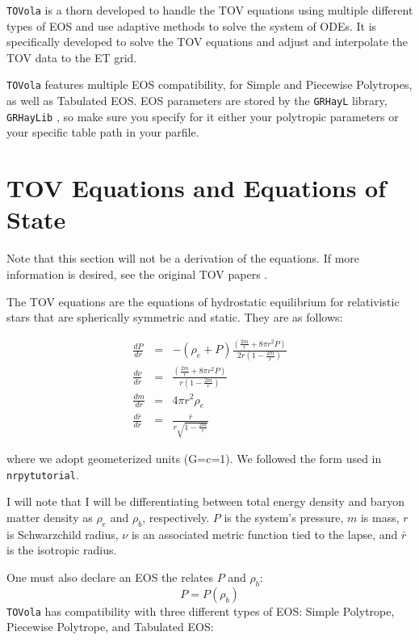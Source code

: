 \texttt{TOVola} is a thorn developed to handle the TOV equations using multiple different types of EOS and use adaptive methods to solve the system of ODEs. It is specifically developed to solve the TOV equations and adjust and interpolate the TOV data to the ET grid.

\texttt{TOVola} features multiple EOS compatibility, for Simple and Piecewise Polytropes, as well as Tabulated EOS. EOS parameters are stored by the \texttt{GRHayL} library, \texttt{GRHayLib} \cite{TOVola_TOVola_GRHayL}, so make sure you specify for it either your polytropic parameters or your specific table path in your parfile.

\section{TOV Equations and Equations of State}

Note that this section will not be a derivation of the equations. If more information is desired, see the original TOV papers \cite{TOVola_TOVola_Tolman, TOVola_TOVola_OppVol}.

The TOV equations are the equations of hydrostatic equilibrium for relativistic stars that are spherically symmetric and static. They are as follows:

\begin{eqnarray}
    \frac{dP}{dr} & = & -(\rho_e+P)\frac{(\frac{2m}{r}+8\pi r^2P)}{2r(1-\frac{2m}{r})} \\
    \frac{d\nu}{dr} & = & \frac{(\frac{2m}{r}+8\pi r^2P)}{r(1-\frac{2m}{r})} \\
    \frac{dm}{dr} & = & 4\pi r^2 \rho_e \\
    \frac{d\bar{r}}{dr} & = & \frac{\bar{r}}{r\sqrt{1-\frac{2m}{r}}}
\end{eqnarray}

where we adopt geometerized units (G=c=1). We followed the form used in \texttt{nrpytutorial}.\cite{TOVola_TOVola_NRpy}

I will note that I will be differentiating between total energy density and baryon matter density as $\rho_e$ and $\rho_b$, respectively. $P$ is the system's pressure, $m$ is mass, $r$ is Schwarzchild radius, $\nu$ is an associated metric function tied to the lapse, and $\bar{r}$ is the isotropic radius.

One must also declare an EOS the relates $P$ and $\rho_b$:
\begin{equation}\label{eqn:TOVola_TOVola_EOS}
P=P(\rho_b)
\end{equation}
\texttt{TOVola} has compatibility with three different types of EOS: Simple Polytrope, Piecewise Polytrope, and Tabulated EOS:

